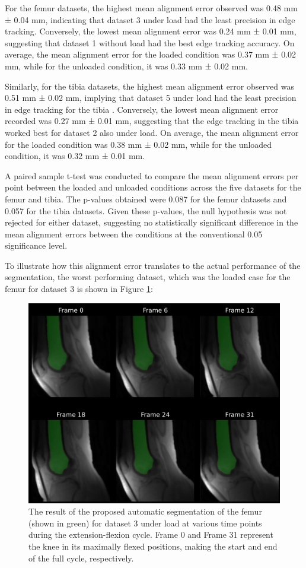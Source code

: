 \documentclass{micro-econ-thesis}
\begin{document}
For the femur datasets, the highest mean alignment error observed was 0.48 mm ± 0.04 mm, indicating that dataset 3 under load had the least precision in edge tracking. Conversely, the lowest mean alignment error was 0.24 mm ± 0.01 mm, suggesting that dataset 1 without load had the best edge tracking accuracy. On average, the mean alignment error for the loaded condition was 0.37 mm ± 0.02 mm, while for the unloaded condition, it was 0.33 mm ± 0.02 mm.

Similarly, for the tibia datasets, the highest mean alignment error observed was 0.51 mm ± 0.02 mm, implying that dataset 5 under load had the least precision in edge tracking for the tibia . Conversely, the lowest mean alignment error recorded was 0.27 mm ± 0.01 mm, suggesting that the edge tracking in the tibia worked best for dataset 2 also under load. On average, the mean alignment error for the loaded condition was 0.38 mm ± 0.02 mm, while for the unloaded condition, it was 0.32 mm ± 0.01 mm.

A paired sample t-test was conducted to compare the mean alignment errors per point between the loaded and unloaded conditions across the five datasets for the femur and tibia. The p-values obtained were 0.087 for the femur datasets and 0.057 for the tibia datasets. Given these p-values, the null hypothesis was not rejected for either dataset, suggesting no statistically significant difference in the mean alignment errors between the conditions at the conventional 0.05 significance level.
   
To illustrate how this alignment error translates to the actual performance of the segmentation, the worst performing dataset, which was the loaded case for the femur for dataset 3 is shown in Figure \ref{fig:d5wfem}: 

\begin{figure}[H]
	\centering
	\includegraphics[width=0.7\linewidth]{d5_W_fem}
	\caption{ The result of the proposed automatic segmentation of the femur (shown in green) for dataset 3 under load at various time points during the extension-flexion cycle. Frame 0 and Frame 31 represent the knee in its maximally flexed positions, making the start and end of the full cycle, respectively.}
	\label{fig:d5wfem}
\end{figure}
\end{document}
